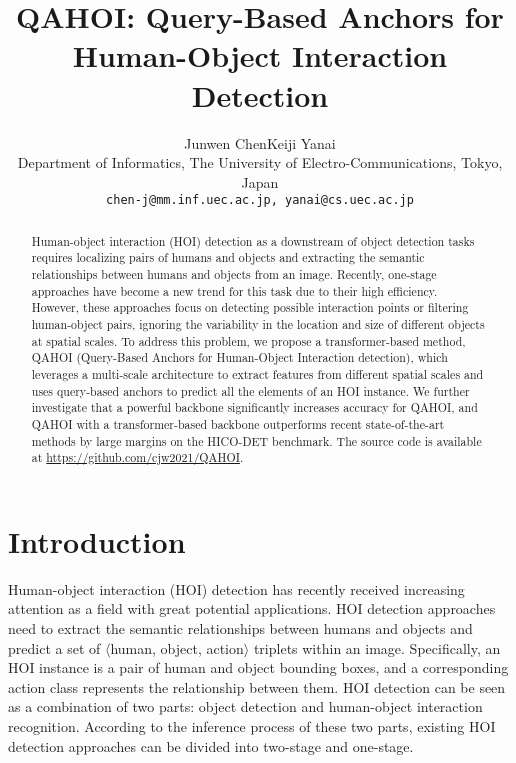 \documentclass[10pt,twocolumn,letterpaper]{article}
\begin{document}
\title{QAHOI: Query-Based Anchors for Human-Object Interaction Detection}

\author{Junwen Chen\qquad Keiji Yanai\\
Department of Informatics, The University of Electro-Communications, Tokyo, Japan\\
{\tt\small chen-j@mm.inf.uec.ac.jp, yanai@cs.uec.ac.jp}
}
\maketitle

\begin{abstract}
  Human-object interaction (HOI) detection as a downstream of object detection tasks requires localizing pairs of humans and objects and extracting the semantic relationships between humans and objects from an image. 
  Recently, one-stage approaches have become a new trend for this task due to their high efficiency. 
  However, these approaches focus on detecting possible interaction points or filtering human-object pairs, ignoring the variability in the location and size of different objects at spatial scales. 
  To address this problem, we propose a transformer-based method, QAHOI (Query-Based Anchors for Human-Object Interaction detection), which leverages a multi-scale architecture to extract features from different spatial scales and uses query-based anchors to predict all the elements of an HOI instance. 
  We further investigate that a powerful backbone significantly increases accuracy for QAHOI, and QAHOI with a transformer-based backbone outperforms recent state-of-the-art methods by large margins on the HICO-DET benchmark.
  The source code is available at  
  \url{https://github.com/cjw2021/QAHOI}.
\end{abstract}

\section{Introduction}
\label{sec:intro}

Human-object interaction (HOI) detection has recently received increasing attention as a field with great potential applications.
HOI detection approaches need to extract the semantic relationships between humans and objects and predict a set of $\langle$human, object, action$\rangle$ triplets within an image.
Specifically, an HOI instance is a pair of human and object bounding boxes, and a corresponding action class represents the relationship between them.
HOI detection can be seen as a combination of two parts: object detection and human-object interaction recognition.
According to the inference process of these two parts, existing HOI detection approaches can be divided into two-stage and one-stage.
\end{document}
